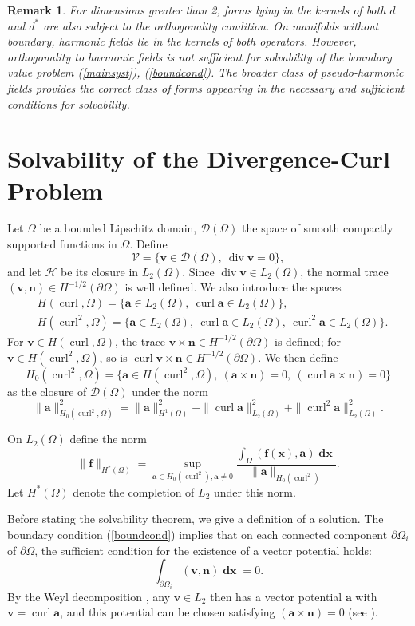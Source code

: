 \documentclass[a4paper]{article}
\newcommand{\bx}{\mathbf{x}}
\newcommand{\bff}{\mathbf{f}}
\newcommand{\dx}{\operatorname{\mathbf{dx}}}
\newcommand{\ba}{\mathbf{a}}
\newcommand{\curl}{\operatorname{curl}}
\newcommand{\divv}{\operatorname{div}}
\newcommand{\bv}{\mathbf{v}}
\newcommand{\bn}{\mathbf{n}}
\newtheorem{remark*}{Remark}[]
\begin{document}
\begin{remark*}
For dimensions greater than 2, forms lying in the kernels of both $d$ and $d^*$ are also subject to the orthogonality condition. On manifolds without boundary, harmonic fields lie in the kernels of both operators. However, orthogonality to harmonic fields is not sufficient for solvability of the boundary value problem (\ref{mainsyst}), (\ref{boundcond}). The broader class of pseudo-harmonic fields provides the correct class of forms appearing in the necessary and sufficient conditions for solvability.
\end{remark*}

\section{Solvability of the Divergence-Curl Problem}

Let $\Omega$ be a bounded Lipschitz domain, $\mathcal D(\Omega)$ the space of smooth compactly supported functions in $\Omega$. Define
$$
\mathcal{V}=\{ \bv \in \mathcal D(\Omega),~\divv \bv=0 \},
$$
and let $\mathcal H$ be its closure in $L_2(\Omega)$. Since $\divv \bv \in L_2(\Omega)$, the normal trace $(\bv,\bn)\in H^{-1/2}(\partial \Omega)$ is well defined.
We also introduce the spaces
\begin{align*}
&H(\curl,\Omega) = \{\ba\in L_2(\Omega),~\curl \ba\in L_2(\Omega)\},\\
&H(\curl^2,\Omega) = \{\ba \in L_2(\Omega),~\curl \ba\in L_2(\Omega),~\curl^2 \ba\in L_2(\Omega)\}.
\end{align*}
For $\bv \in H(\curl, \Omega)$, the trace $\bv \times \bn \in H^{-1/2}(\partial \Omega)$ is defined; for $\bv \in H(\curl^2, \Omega)$, so is $\curl \bv \times \bn \in H^{-1/2}(\partial \Omega)$. We then define
$$
H_0(\curl^2,\Omega) = \{\ba\in H(\curl^2,\Omega),~( \ba \times \bn)=0,~(\curl \ba \times \bn)=0\}
$$
as the closure of $\mathcal D(\Omega)$ under the norm
$$
\|\ba \|_{H_0(\curl^2,\Omega)}^2 = \|\ba \|_{H^1(\Omega)}^2 + \| \curl \ba \|_{L_2(\Omega)}^2+ \| \curl^2 \ba \|_{L_2(\Omega)}^2.
$$

On $L_2(\Omega)$ define the norm
$$
\|\bff\|_{H^*(\Omega)} = \sup_{\ba \in H_0(\curl^2),\ba\neq 0} \frac{\int_{\Omega} (\bff(\bx), \ba) \dx}{\|\ba\|_{H_0(\curl^2)}}.
$$
Let $H^*(\Omega)$ denote the completion of $L_2$ under this norm.

Before stating the solvability theorem, we give a definition of a solution. The boundary condition (\ref{boundcond}) implies that on each connected component $\partial \Omega_i$ of $\partial \Omega$, the sufficient condition for the existence of a vector potential holds:
$$
\int_{\partial \Omega_i} (\bv, \bn) \dx = 0.
$$
By the Weyl decomposition \cite{Monk}\cite{Temam}, any $\bv \in L_2$ then has a vector potential $\ba$ with $\bv = \curl \ba$, and this potential can be chosen satisfying $(\ba \times \bn)=0$ (see \cite{BramblePasciak}).
\end{document}
